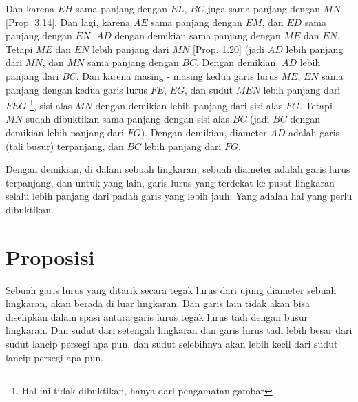 \documentclass[a4paper]{book}
\begin{document}
Dan karena $EH$ sama panjang dengan $EL$, $BC$ juga sama panjang dengan $MN$
[Prop. 3.14]. Dan lagi, karena $AE$ sama panjang dengan $EM$, dan $ED$ sama 
panjang dengan $EN$, $AD$ dengan demikian sama panjang dengan $ME$ dan $EN$.
Tetapi $ME$ dan $EN$ lebih panjang dari $MN$ [Prop. 1.20] (jadi $AD$ lebih
panjang dari $MN$, dan $MN$ sama panjang dengan $BC$. Dengan demikian, $AD$
lebih panjang dari $BC$. Dan karena masing - masing kedua garis lurus $ME$, 
$EN$ sama panjang dengan kedua garis lurus $FE$, $EG$, dan sudut $MEN$ lebih
panjang dari $FEG$ \footnote{Hal ini tidak dibuktikan, hanya dari pengamatan
gambar}, sisi alas $MN$ dengan demikian lebih panjang dari sisi alas $FG$. Tetapi $MN$ sudah dibuktikan sama panjang dengan sisi alas $BC$ 
(jadi $BC$ dengan demikian lebih panjang dari $FG$). Dengan demikian, diameter
$AD$ adalah garis (tali busur) terpanjang, dan $BC$ lebih panjang dari $FG$.

Dengan demikian, di dalam sebuah lingkaran, sebuah diameter adalah garis lurus
terpanjang, dan untuk yang lain, garis lurus yang terdekat ke pusat lingkaran
selalu lebih panjang dari padah garis yang lebih jauh. Yang adalah hal yang
perlu dibuktikan.

\section*{\centering Proposisi \thesection}

Sebuah garis lurus yang ditarik secara tegak lurus dari ujung diameter sebuah 
lingkaran, akan berada di luar lingkaran. Dan garis lain tidak akan bisa
diselipkan dalam spasi  antara garis lurus tegak lurus tadi dengan busur 
lingkaran. Dan sudut dari setengah lingkaran dan garis lurus tadi lebih besar 
dari sudut lancip persegi apa pun, dan sudut selebihnya akan lebih kecil 
dari sudut lancip persegi apa pun.

\begin{center}
\end{center}
\end{document}
